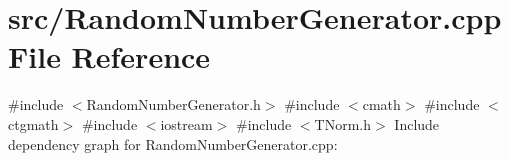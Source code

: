 \section{src/\+Random\+Number\+Generator.cpp File Reference}
\label{_random_number_generator_8cpp}
{\ttfamily \#include $<$Random\+Number\+Generator.\+h$>$}\newline
{\ttfamily \#include $<$cmath$>$}\newline
{\ttfamily \#include $<$ctgmath$>$}\newline
{\ttfamily \#include $<$iostream$>$}\newline
{\ttfamily \#include $<$T\+Norm.\+h$>$}\newline
Include dependency graph for Random\+Number\+Generator.\+cpp\+:
